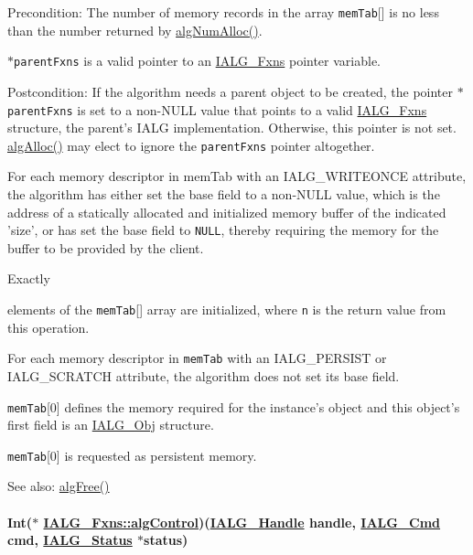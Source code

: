 \begin{Desc}
\item[Precondition:]The number of memory records in the array {\tt mem\-Tab}\mbox{[}\mbox{]} is no less than the number returned by \hyperlink{struct_i_a_l_g___fxns_098c1ca275465bb4acc1d3d0cf060160}{alg\-Num\-Alloc()}.

{\tt $\ast$parent\-Fxns} is a valid pointer to an \hyperlink{struct_i_a_l_g___fxns}{IALG\_\-Fxns} pointer variable.\end{Desc}
\begin{Desc}
\item[Postcondition:]If the algorithm needs a parent object to be created, the pointer {\tt $\ast$parent\-Fxns} is set to a non-NULL value that points to a valid \hyperlink{struct_i_a_l_g___fxns}{IALG\_\-Fxns} structure, the parent's IALG implementation. Otherwise, this pointer is not set. \hyperlink{struct_i_a_l_g___fxns_1640ba8f4033af1ce3887283c7a12746}{alg\-Alloc()} may elect to ignore the {\tt parent\-Fxns} pointer altogether.

For each memory descriptor in mem\-Tab with an IALG\_\-WRITEONCE attribute, the algorithm has either set the base field to a non-NULL value, which is the address of a statically allocated and initialized memory buffer of the indicated 'size', or has set the base field to {\tt NULL}, thereby requiring the memory for the buffer to be provided by the client.

Exactly \par
 elements of the {\tt mem\-Tab}\mbox{[}\mbox{]} array are initialized, where {\tt n} is the return value from this operation.

For each memory descriptor in {\tt mem\-Tab} with an IALG\_\-PERSIST or IALG\_\-SCRATCH attribute, the algorithm does not set its base field.

{\tt mem\-Tab}\mbox{[}0\mbox{]} defines the memory required for the instance's object and this object's first field is an \hyperlink{struct_i_a_l_g___obj}{IALG\_\-Obj} structure.

{\tt mem\-Tab}\mbox{[}0\mbox{]} is requested as persistent memory.\end{Desc}
\begin{Desc}
\item[See also:]\hyperlink{struct_i_a_l_g___fxns_c6f87b240d96486e3e88e80b95046ade}{alg\-Free()} \end{Desc}
\hypertarget{struct_i_a_l_g___fxns_4c506a1599a604b02b30097e61ff4b89}{
\paragraph[algControl]{\setlength{\rightskip}{0pt plus 5cm}Int($\ast$ \hyperlink{struct_i_a_l_g___fxns_4c506a1599a604b02b30097e61ff4b89}{IALG\_\-Fxns::alg\-Control})(\hyperlink{struct_i_a_l_g___obj}{IALG\_\-Handle} handle, \hyperlink{group__ti__xdais___i_a_l_g_g9032f20923ef2ba1d6b88c87a20075fa}{IALG\_\-Cmd} cmd, \hyperlink{struct_i_a_l_g___status}{IALG\_\-Status} $\ast$status)}\hfill}
\label{struct_i_a_l_g___fxns_4c506a1599a604b02b30097e61ff4b89}


